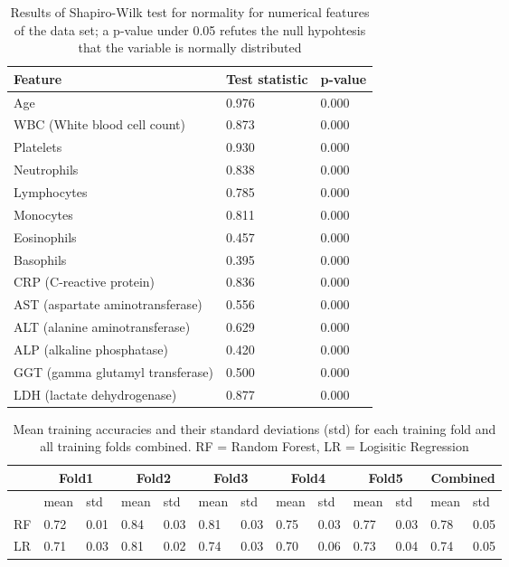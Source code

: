 \begin{table}
\begin{tabular}{lll}
Feature                          & Test statistic & p-value \\ \hline
Age                              & 0.976          & 0.000   \\
WBC (White blood cell count)     & 0.873          & 0.000   \\
Platelets                        & 0.930          & 0.000   \\
Neutrophils                      & 0.838          & 0.000   \\
Lymphocytes                      & 0.785          & 0.000   \\
Monocytes                        & 0.811          & 0.000   \\
Eosinophils                      & 0.457          & 0.000   \\
Basophils                        & 0.395          & 0.000   \\
CRP (C-reactive protein)         & 0.836          & 0.000   \\
AST (aspartate aminotransferase) & 0.556          & 0.000   \\
ALT (alanine aminotransferase)   & 0.629          & 0.000   \\
ALP (alkaline phosphatase)       & 0.420          & 0.000   \\
GGT (gamma glutamyl transferase) & 0.500          & 0.000   \\
LDH (lactate dehydrogenase)      & 0.877          & 0.000  
\end{tabular}
\caption{Results of Shapiro-Wilk test for normality for numerical features of 
the data set; a p-value under 0.05 refutes the null hypohtesis that the 
variable is normally distributed}
\label{tab:shapiro-wilk}
\end{table}

\begin{table}
\centering
\begin{tabular}{lllllllllllll}
 &
  \multicolumn{2}{c}{Fold1} &
  \multicolumn{2}{c}{Fold2} &
  \multicolumn{2}{c}{Fold3} &
  \multicolumn{2}{c}{Fold4} &
  \multicolumn{2}{c}{Fold5} &
  \multicolumn{2}{c}{Combined} \\ \hline
                    & mean & std  & mean & std  & mean & std  & mean & std  & 
mean & std  & mean & std  \\ \hline
RF       & 0.72 & 0.01 & 0.84 & 0.03 & 0.81 & 0.03 & 0.75 & 0.03 & 
0.77 & 0.03 & 0.78 & 0.05 \\
LR & 0.71 & 0.03 & 0.81 & 0.02 & 0.74 & 0.03 & 0.70 & 0.06 & 
0.73 & 0.04 & 0.74 & 0.05
\end{tabular}
\caption{Mean training accuracies and their standard deviations (std) 
for each training fold and all training folds combined. RF = Random Forest, 
LR = Logisitic Regression }
\label{tab:training-acc}
\end{table}

